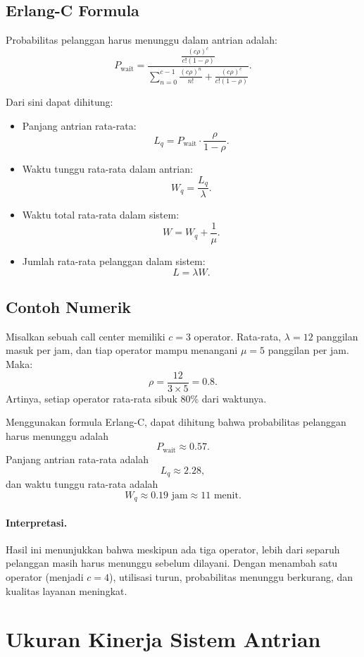 \documentclass{bukumjh}
\begin{document}
\subsection{Erlang-C Formula}
Probabilitas pelanggan harus menunggu dalam antrian adalah:
\[
P_\text{wait} = \dfrac{\frac{(c\rho)^c}{c!(1-\rho)}}{\sum_{n=0}^{c-1} \frac{(c\rho)^n}{n!} + \frac{(c\rho)^c}{c!(1-\rho)}}.
\]

Dari sini dapat dihitung:
\begin{itemize}
    \item Panjang antrian rata-rata:
    \[
    L_q = P_\text{wait} \cdot \frac{\rho}{1-\rho}.
    \]
    \item Waktu tunggu rata-rata dalam antrian:
    \[
    W_q = \frac{L_q}{\lambda}.
    \]
    \item Waktu total rata-rata dalam sistem:
    \[
    W = W_q + \frac{1}{\mu}.
    \]
    \item Jumlah rata-rata pelanggan dalam sistem:
    \[
    L = \lambda W.
    \]
\end{itemize}

\subsection{Contoh Numerik}
Misalkan sebuah call center memiliki $c=3$ operator. Rata-rata, $\lambda = 12$ panggilan masuk per jam, dan tiap operator mampu menangani $\mu = 5$ panggilan per jam. Maka:
\[
\rho = \frac{12}{3 \times 5} = 0.8.
\]
Artinya, setiap operator rata-rata sibuk 80\% dari waktunya.

Menggunakan formula Erlang-C, dapat dihitung bahwa probabilitas pelanggan harus menunggu adalah
\[
P_\text{wait} \approx 0.57.
\]
Panjang antrian rata-rata adalah
\[
L_q \approx 2.28,
\]
dan waktu tunggu rata-rata adalah
\[
W_q \approx 0.19 \text{ jam} \approx 11 \text{ menit}.
\]

\paragraph{Interpretasi.}  
Hasil ini menunjukkan bahwa meskipun ada tiga operator, lebih dari separuh pelanggan masih harus menunggu sebelum dilayani. Dengan menambah satu operator (menjadi $c=4$), utilisasi turun, probabilitas menunggu berkurang, dan kualitas layanan meningkat.

\section{Ukuran Kinerja Sistem Antrian}
\end{document}
